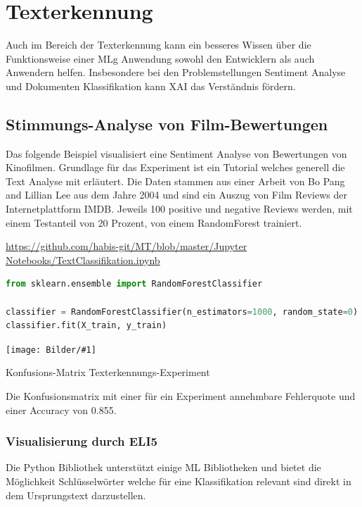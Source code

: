 \documentclass[
  12pt, %
  a4paper, %
  oneside, %
  openany, 
  numbers=noenddot, %
  BCOR=5mm, %
  parskip=half*, %
  thesis, %
]{bfhbook}
\newcommand{\imgText}[3]{
\begin{center}
    \begin{minipage}[t]{0.6\textwidth}
    		\vspace{0pt}
		\texttt{[image: Bilder/\#1]}
		\caption{#2}
	\end{minipage}\hfill
    \begin{minipage}[t]{0.4\textwidth}
    		\vspace{0pt}
  		#3
    \end{minipage}
\end{center}
}
\begin{document}
\section{Texterkennung}
Auch im Bereich der Texterkennung kann ein besseres Wissen über die Funktionsweise einer \Gls{MLg} Anwendung sowohl den Entwicklern als auch Anwendern helfen. Insbesondere bei den Problemstellungen Sentiment Analyse und Dokumenten Klassifikation kann \Gls{XAI} das Verständnis fördern.

\subsection{Stimmungs-Analyse von Film-Bewertungen}
Das folgende Beispiel visualisiert eine Sentiment Analyse von Bewertungen von Kinofilmen. Grundlage für das Experiment ist ein Tutorial \cite{movieReview} welches generell die Text Analyse mit \cite{scikit-learnLink} erläutert. Die Daten stammen aus einer Arbeit von Bo Pang and Lillian Lee \parencite{Pang+Lee2004} aus dem Jahre 2004 und sind ein Auszug von Film Reviews der Internetplattform IMDB. Jeweils 100 positive und negative Reviews werden, mit einem Testanteil von 20 Prozent, von einem RandomForest trainiert.

\url{https://github.com/habis-git/MT/blob/master/Jupyter Notebooks/TextClassifikation.ipynb}

\begin{lstlisting}[language=Python]
from sklearn.ensemble import RandomForestClassifier

classifier = RandomForestClassifier(n_estimators=1000, random_state=0)
classifier.fit(X_train, y_train)
\end{lstlisting}

\imgText{MovieReviews-SentimentClassification_ConfMatrix.PNG}{Konfusions-Matrix Texterkennungs-Experiment}{
}
Die Konfusionsmatrix mit einer für ein Experiment annehmbare Fehlerquote und einer Accuracy von 0.855.

\subsubsection*{Visualisierung durch ELI5}
Die Python Bibliothek \cite{ELI5} unterstützt einige \gls{ML} Bibliotheken und bietet die Möglichkeit Schlüsselwörter welche für eine Klassifikation relevant sind direkt in dem Ursprungstext darzustellen. 
\end{document}
